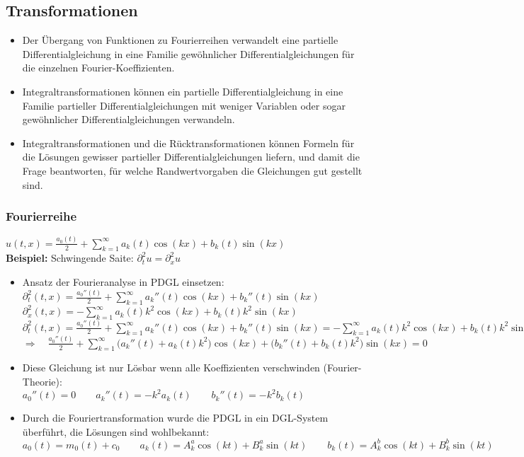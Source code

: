 \subsection{Transformationen}


\begin{itemize}
\item Der Übergang von Funktionen zu Fourierreihen verwandelt eine partielle
Differentialgleichung in eine Familie gewöhnlicher Differentialgleichungen für
die einzelnen Fourier-Koeffizienten.
\item Integraltransformationen können ein partielle Differentialgleichung in eine
Familie partieller Differentialgleichungen mit weniger Variablen oder sogar
gewöhnlicher Differentialgleichungen verwandeln.
\item Integraltransformationen und die Rücktransformationen können Formeln
für die Lösungen gewisser partieller Differentialgleichungen liefern, und
damit die Frage beantworten, für welche Randwertvorgaben die Gleichungen
gut gestellt sind.
\end{itemize}

\subsubsection{Fourierreihe}

$\boxed{u(t,x)=\frac{a_0(t)}{2}+\sum\limits_{k=1}^{\infty}{a_k(t)\cos(kx)+b_k(t)\sin(kx)}}$\\[0.4cm]

\textbf{Beispiel:} Schwingende Saite: $\boxed{\partial_t^2u=\partial_x^2u}$\\

\begin{itemize}
\item Ansatz der Fourieranalyse in PDGL einsetzen:
$\partial_t^2(t,x)=\frac{a_0''(t)}{2}+\sum\limits_{k=1}^{\infty}{a_k''(t)\cos(kx)+b_k''(t)\sin(kx)}$\\
$\partial_x^2(t,x)=-\sum\limits_{k=1}^{\infty}{a_k(t)k^2\cos(kx)+b_k(t)k^2\sin(kx)}$\\
$\partial_t^2(t,x)=\frac{a_0''(t)}{2}+\sum\limits_{k=1}^{\infty}{a_k''(t)\cos(kx)+b_k''(t)\sin(kx)}=-\sum\limits_{k=1}^{\infty}{a_k(t)k^2\cos(kx)+b_k(t)k^2\sin(kx)}=\partial_x^2(t,x)$\\[0.2cm]
$\boxed{\Rightarrow\quad \frac{a_0''(t)}{2}+\sum\limits_{k=1}^{\infty}{\big(a_k''(t)+a_k(t)k^2\big)\cos(kx)+\big(b_k''(t)+b_k(t)k^2\big)\sin(kx)}=0}$
\item Diese Gleichung ist nur Lösbar wenn alle Koeffizienten verschwinden (Fourier-Theorie):\\[0.2cm]
$a_0''(t)=0 \qquad a_k''(t)=-k^2a_k(t)\qquad b_k''(t)=-k^2b_k(t)$
\item Durch die Fouriertransformation wurde die PDGL in ein DGL-System überführt, die Lösungen sind wohlbekannt:\\[0.2cm]
$a_0(t)=m_0(t)+c_0\qquad a_k(t)=A_k^a\cos(kt)+B_k^a\sin(kt)\qquad b_k(t)=A_k^b\cos(kt)+B_k^b\sin(kt)$
\end{itemize}


